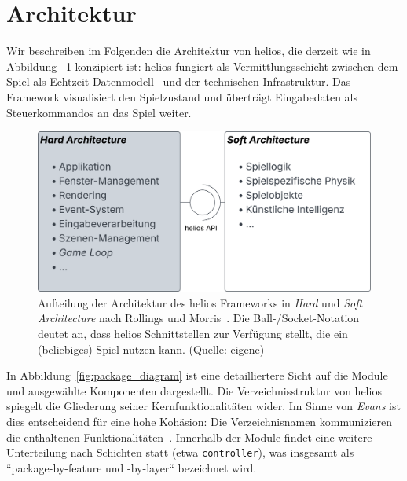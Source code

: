 \section{Architektur}
Wir beschreiben im Folgenden die Architektur von helios, die derzeit wie in Abbildung ~\ref{fig:hardarchitecture} konzipiert ist: helios fungiert als Vermittlungsschicht zwischen dem Spiel als Echtzeit-Datenmodell~\cite[525]{Gre19} und der technischen Infrastruktur.
Das Framework visualisiert den Spielzustand und überträgt Eingabedaten als Steuerkommandos an das Spiel weiter.

\begin{figure}[!h]
    \centering
    \includegraphics[width=1\columnwidth]{img/hardarchitecture.svg}
    \caption{Aufteilung der Architektur des helios Frameworks in \textit{Hard} und \textit{Soft Architecture} nach Rollings und Morris~\cite[612 ff.]{RM04}. Die Ball-/Socket-Notation deutet an, dass helios Schnittstellen zur Verfügung stellt, die ein (beliebiges) Spiel nutzen kann. (Quelle: eigene)}
    \label{fig:hardarchitecture}
\end{figure}

In Abbildung~\ref{fig:package_diagram} ist eine detailliertere Sicht auf die Module und ausgewählte Komponenten dargestellt.
Die Verzeichnisstruktur von helios spiegelt die Gliederung seiner Kernfunktionalitäten wider.
Im Sinne von \textit{Evans} ist dies entscheidend für eine hohe Kohäsion: Die Verzeichnisnamen kommunizieren die enthaltenen Funktionalitäten~\cite[180 f.]{Eva03}.
Innerhalb der Module findet eine weitere Unterteilung nach Schichten statt (etwa \texttt{controller}), was insgesamt als ``package-by-feature und -by-layer`` bezeichnet wird.


